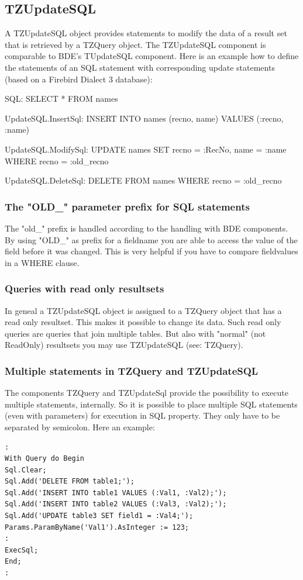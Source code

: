 \documentclass[a4paper,12pt,oneside]{book}
\begin{document}
\subsection{TZUpdateSQL}

A TZUpdateSQL object provides statements to modify the data of a result set that is retrieved by a TZQuery object.
The TZUpdateSQL component is comparable to BDE's TUpdateSQL component.
Here is an example how to define the statements of an SQL statement with corresponding update statements (based on a Firebird Dialect 3 database):

SQL: SELECT * FROM names

UpdateSQL.InsertSql: INSERT INTO names (recno, name) VALUES (:recno, :name)

UpdateSQL.ModifySql: UPDATE names SET recno = :RecNo, name = :name WHERE recno = :old\_recno

UpdateSQL.DeleteSql: DELETE FROM names WHERE recno = :old\_recno

\subsubsection{The "OLD\_" parameter prefix for SQL statements}

The "old\_" prefix is handled according to the handling with BDE components.
By using "OLD\_" as prefix for a fieldname you are able to access the value of the field before it was changed.
This is very helpful if you have to compare fieldvalues in a WHERE clause.

\subsubsection{Queries with read only resultsets}
In geneal a TZUpdateSQL object is assigned to a TZQuery object that has a read only resultset.
This makes it possible to change its data.
Such read only queries are queries that join multiple tables.
But also with "normal" (not ReadOnly) resultsets you may use TZUpdateSQL (see: TZQuery).

\subsubsection{Multiple statements in TZQuery and TZUpdateSQL}
The components TZQuery and TZUpdateSql provide the possibility to execute multiple statements, internally.
So it is possible to place multiple SQL statements (even with parameters) for execution in SQL property.
They only have to be separated by semicolon. Here an example:
\begin{verbatim}
:
With Query do Begin
Sql.Clear;
Sql.Add('DELETE FROM table1;');
Sql.Add('INSERT INTO table1 VALUES (:Val1, :Val2);');
Sql.Add('INSERT INTO table2 VALUES (:Val3, :Val2);');
Sql.Add('UPDATE table3 SET field1 = :Val4;');
Params.ParamByName('Val1').AsInteger := 123;
:
ExecSql;
End;
:
\end{verbatim}
\end{document}
